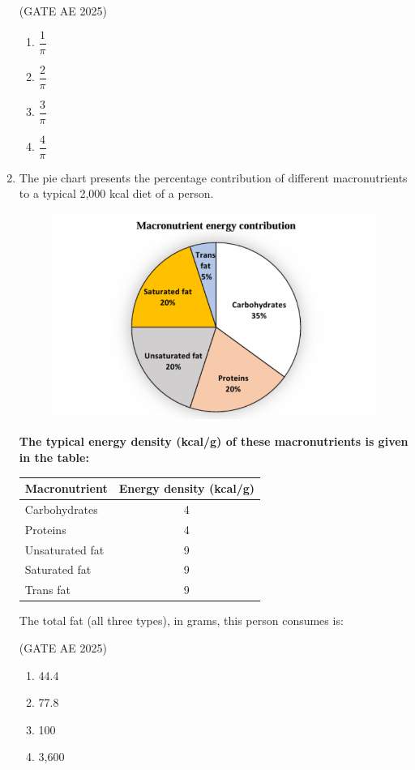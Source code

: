 \documentclass[journal,12pt,onecolumn]{IEEEtran}
\theoremstyle{remark}
\begin{document}
\begin{flushleft}
\begin{enumerate}
\hfill (GATE AE 2025)

\begin{enumerate}
    \item $\dfrac{1}{\pi}$
    \item $\dfrac{2}{\pi}$
    \item $\dfrac{3}{\pi}$ 
    \item $\dfrac{4}{\pi}$
\end{enumerate} 

\item The pie chart presents the percentage contribution of different macronutrients to a typical 2,000 kcal diet of a person.
\begin{figure}[h]
    \centering
    \includegraphics[width=0.5\columnwidth]{figs/pie chart.png}
    \caption{}
    \label{fig:placeholder}
\end{figure}

\textbf{The typical energy density (kcal/g) of these macronutrients is given in the table:}
\begin{center}
\begin{tabular}{|l|c|}
\hline
\textbf{Macronutrient} & \textbf{Energy density (kcal/g)} \\
\hline
Carbohydrates & 4 \\
Proteins & 4 \\
Unsaturated fat & 9 \\
Saturated fat & 9 \\
Trans fat & 9 \\
\hline
\end{tabular}
\end{center}

The total fat (all three types), in grams, this person consumes is: 

\hfill (GATE AE 2025)

    \begin{enumerate}
        \item 44.4
        \item 77.8
        \item 100
        \item 3,600
 \end{enumerate}


\end{enumerate}
\end{flushleft}
\end{document}
